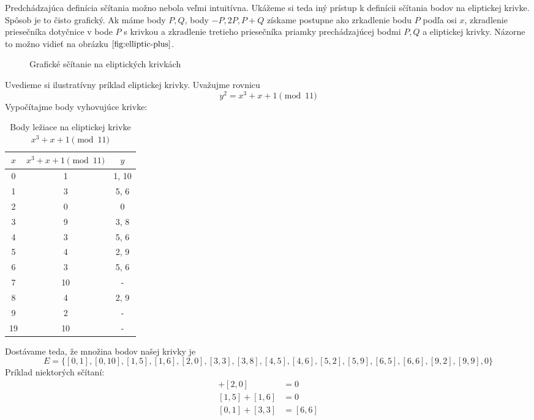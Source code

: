 Predchádzajúca definícia sčítania možno nebola veľmi intuitívna.
Ukážeme si teda iný prístup k definícii sčítania bodov na eliptickej
krivke. Spôsob je to čisto grafický.
Ak máme body $P,Q$, body $-P, 2P, P+Q$ získame postupne ako
zrkadlenie bodu $P$ podľa osi $x$,
zkradlenie priesečníka dotyčnice v bode $P$ s krivkou
a zkradlenie tretieho priesečníka priamky prechádzajúcej bodmi $P,Q$ a
eliptickej krivky. Názorne to možno vidieť na obrázku
$\ref{fig:elliptic-plus}$.

\begin{figure}
    \centering

    \caption{Grafické sčítanie na eliptických krivkách}
    \label{fig:elliptic-plus}
\end{figure}

\begin{priklad}
    Uvedieme si ilustratívny príklad eliptickej krivky. Uvažujme
    rovnicu
    \begin{equation*}
        y^2 = x^3 + x + 1 \pmod{11}
    \end{equation*}
    Vypočítajme body vyhovujúce krivke:

    \begin{table}[h!]
        \centering
        \begin{tabular}{c|c|c}
            $x$ & $x^3 + x + 1 \pmod{11}$ & $y$ \\
            \hline 0 & 1 & 1, 10 \\
            \hline 1 & 3 & 5, 6 \\
            \hline 2 & 0 & 0 \\
            \hline 3 & 9 & 3, 8 \\
            \hline 4 & 3 & 5, 6 \\
            \hline 5 & 4 & 2, 9 \\
            \hline 6 & 3 & 5, 6 \\
            \hline 7 & 10 & - \\
            \hline 8 & 4 & 2, 9 \\
            \hline 9 & 2 & - \\
            \hline 19 & 10 & - \\
        \end{tabular}
        \caption{Body ležiace na eliptickej krivke $x^3 + x + 1
        \pmod{11}$}
    \end{table}
    Dostávame teda, že množina bodov našej krivky je
    \begin{equation*}
       E=\Big\{ [0,1], [0,10], [1,5], [1,6],
                [2,0], [3,3], [3,8],
                [4,5], [4,6], [5,2], [5,9],
                [6,5], [6,6], [9,2], [9,9], 0 \Big\}
    \end{equation*}
    Príklad niektorých sčítaní:
    \begin{align*}
        [2,0] + [2,0] &= 0 \\
        [1,5] + [1,6] &= 0 \\
        [0,1] + [3,3] &= [6, 6] 
    \end{align*}
\end{priklad}
